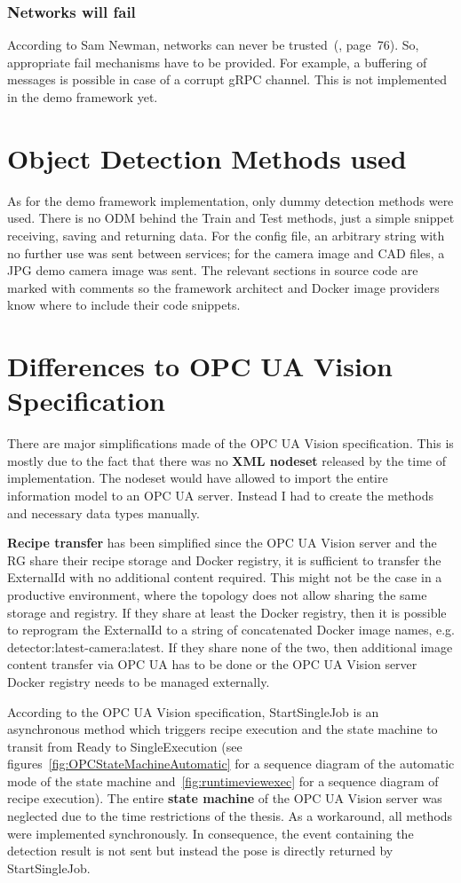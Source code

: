 \subsubsection{Networks will fail}
According to Sam Newman, networks can never be trusted~(\cite{Newman2015BuildingMicroservices}, page~76). So, appropriate fail mechanisms have to be provided. For example, a buffering of messages is possible in case of a corrupt gRPC channel. This is not implemented in the demo framework yet.

\section{Object Detection Methods used}
As for the demo framework implementation, only dummy detection methods were used. There is no ODM behind the Train and Test methods, just a simple snippet receiving, saving and returning data. For the config file, an arbitrary string with no further use was sent between services; for the camera image and CAD files, a JPG demo camera image was sent. The relevant sections in source code are marked with comments so the framework architect and Docker image providers know where to include their code snippets.

\section{Differences to OPC UA Vision Specification}
There are major simplifications made of the OPC UA Vision specification. This is mostly due to the fact that there was no \textbf{XML nodeset} released by the time of implementation. The nodeset would have allowed to import the entire information model to an OPC UA server. Instead I had to create the methods and necessary data types manually.

\textbf{Recipe transfer} has been simplified since the OPC UA Vision server and the RG share their recipe storage and Docker registry, it is sufficient to transfer the ExternalId with no additional content required. This might not be the case in a productive environment, where the topology does not allow sharing the same storage and registry. If they share at least the Docker registry, then it is possible to reprogram the ExternalId to a string of concatenated Docker image names, e.g. detector:latest-camera:latest. If they share none of the two, then additional image content transfer via OPC UA has to be done or the OPC UA Vision server Docker registry needs to be managed externally.

According to the OPC UA Vision specification, StartSingleJob is an asynchronous method which triggers recipe execution and the state machine to transit from Ready to SingleExecution (see figures~\ref{fig:OPCStateMachineAutomatic} for a sequence diagram of the automatic mode of the state machine and~\ref{fig:runtimeviewexec} for a sequence diagram of recipe execution). The entire \textbf{state machine} of the OPC UA Vision server was neglected due to the time restrictions of the thesis. As a workaround, all methods were implemented synchronously. In consequence, the event containing the detection result is not sent but instead the pose is directly returned by StartSingleJob.


